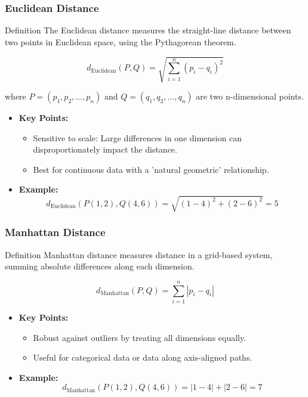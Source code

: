 \documentclass[aspectratio=169]{beamer}
\begin{document}
\begin{frame}[fragile]
  \frametitle{Euclidean Distance}
  
  \begin{block}{Definition}
    The Euclidean distance measures the straight-line distance between two points in Euclidean space, using the Pythagorean theorem.
  \end{block}

  \begin{equation}
    d_{\text{Euclidean}}(P, Q) = \sqrt{\sum_{i=1}^{n} (p_i - q_i)^2}
  \end{equation}
  
  where \( P = (p_1, p_2, \ldots, p_n) \) and \( Q = (q_1, q_2, \ldots, q_n) \) are two n-dimensional points.

  \begin{itemize}
    \item \textbf{Key Points:}
    \begin{itemize}
      \item Sensitive to scale: Large differences in one dimension can disproportionately impact the distance.
      \item Best for continuous data with a 'natural geometric' relationship.
    \end{itemize}
    
    \item \textbf{Example:}
    \[
    d_{\text{Euclidean}}(P(1, 2), Q(4, 6)) = \sqrt{(1-4)^2 + (2-6)^2} = 5
    \]
  \end{itemize}
\end{frame}

\begin{frame}[fragile]
  \frametitle{Manhattan Distance}
  
  \begin{block}{Definition}
    Manhattan distance measures distance in a grid-based system, summing absolute differences along each dimension.
  \end{block}

  \begin{equation}
    d_{\text{Manhattan}}(P, Q) = \sum_{i=1}^{n} |p_i - q_i|
  \end{equation}

  \begin{itemize}
    \item \textbf{Key Points:}
    \begin{itemize}
      \item Robust against outliers by treating all dimensions equally.
      \item Useful for categorical data or data along axis-aligned paths.
    \end{itemize}
    
    \item \textbf{Example:}
    \[
    d_{\text{Manhattan}}(P(1, 2), Q(4, 6)) = |1-4| + |2-6| = 7
    \]
  \end{itemize}
\end{frame}
\end{document}
